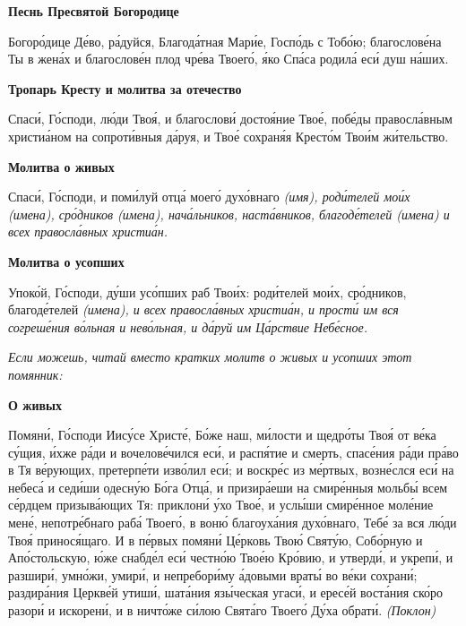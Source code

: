  

\bfseries Песнь Пресвятой Богородице\normalfont{}


   Богоро́дице Де́во, ра́дуйся, Благода́тная Мари́е, Госпо́дь с Тобо́ю;
благослове́на Ты в жена́х и благослове́н плод чре́ва Твоего́, я́ко Спа́са
родила́ еси́ душ на́ших.



 

\bfseries Тропарь Кресту и молитва за отечество\normalfont{}


   Спаси́, Го́споди, лю́ди Твоя́, и благослови́ достоя́ние Твое́, побе́ды
правосла́вным христиа́ном на сопроти́вныя да́руя, и Твое́ сохраня́я Кресто́м
Твои́м жи́тельство.



 

\bfseries Молитва о живых\normalfont{}


   Спаси́, Го́споди, и поми́луй отца́ моего́ духо́внаго \itshape (имя)\normalfont{}, роди́телей мои́х
\itshape (имена)\normalfont{}, сро́дников \itshape (имена)\normalfont{}, нача́льников, наста́вников, благоде́телей \itshape (имена)\normalfont{}
и всех правосла́вных христиа́н.



 

\bfseries Молитва о усопших\normalfont{}


   Упоко́й, Го́споди, ду́ши усо́пших раб Твои́х: роди́телей мои́х, сро́дников,
благоде́телей \itshape (имена)\normalfont{}, и всех правосла́вных христиа́н, и прости́ им вся
согреше́ния во́льная и нево́льная, и да́руй им Ца́рствие Небе́сное.


 \itshape Если можешь, читай вместо кратких молитв о живых и усопших этот
помянник:\normalfont{}



 

\bfseries О живых\normalfont{}


   Помяни́, Го́споди Иису́се Христе́, Бо́же наш, ми́лости и щедро́ты Твоя́ от
ве́ка су́щия, и́хже ра́ди и вочелове́чился еси́, и распя́тие и смерть, спасе́ния
ра́ди пра́во в Тя ве́рующих, претерпе́ти изво́лил еси́; и воскре́с из ме́ртвых,
возне́слся еси́ на небеса́ и седи́ши одесну́ю Бо́га Отца́, и призира́еши на
смире́нныя мольбы́ всем се́рдцем призыва́ющих Тя: приклони́ у́хо Твое́, и
услы́ши смире́нное моле́ние мене́, непотре́бнаго раба́ Твоего́, в воню́
благоуха́ния духо́внаго, Тебе́ за вся лю́ди Твоя́ принося́щаго. И в пе́рвых
помяни́ Це́рковь Твою́ Святу́ю, Собо́рную и Апо́стольскую, ю́же снабде́л еси́
честно́ю Твое́ю Кро́вию, и утверди́, и укрепи́, и разшири́, умно́жи,
умири́, и непребори́му а́довыми враты́ во ве́ки сохрани́; раздира́ния
Церкве́й утиши́, шата́ния язы́ческая угаси́, и ересе́й воста́ния ско́ро
разори́ и искорени́, и в ничто́же си́лою Свята́го Твоего́ Ду́ха обрати́.
\itshape (Поклон)\normalfont{}


